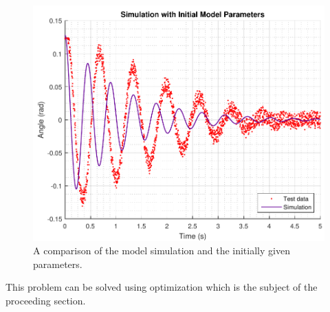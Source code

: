 \begin{figure}[H] 
	\centering
	\includegraphics[width=.7\textwidth]{figures/InitialModelParameterCompare}
	\caption{A comparison of the model simulation and the initially given parameters.}
	\label{InitialModelParameterCompare}
\end{figure}

This problem can be solved using optimization which is the subject of the proceeding section.
